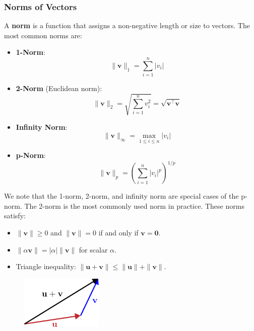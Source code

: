 \subsubsection{Norms of Vectors}
A \textbf{norm} is a function that assigns a non-negative length or size to vectors. The most common norms are:
\begin{itemize}
    \item \textbf{1-Norm}:
    \begin{equation*}
        \|\mathbf{v}\|_1 = \sum_{i=1}^n |v_i|
    \end{equation*}
    \item \textbf{2-Norm} (Euclidean norm):
    \begin{equation*}
        \|\mathbf{v}\|_2 = \sqrt{\sum_{i=1}^n v_i^2} = \sqrt{\mathbf{v}^\top \mathbf{v}}
    \end{equation*}
    \item \textbf{Infinity Norm}:
    \begin{equation*}
        \|\mathbf{v}\|_\infty = \max_{1 \leq i \leq n} |v_i|
    \end{equation*}
    \item \textbf{p-Norm}:
    \begin{equation*}
        \|\mathbf{v}\|_p = \left( \sum_{i=1}^n |v_i|^p \right)^{1/p}
    \end{equation*}
\end{itemize}
We note that the 1-norm, 2-norm, and infinity norm are special cases of the p-norm. The 2-norm is the most commonly used norm in practice. These norms satisfy:

\noindent
\begin{minipage}[t]{0.48\textwidth}
    \vspace{-0.4cm}
    \begin{itemize}
        \item $ \|\mathbf{v}\| \geq 0 $ and $ \|\mathbf{v}\| = 0 $ if and only if $ \mathbf{v} = \mathbf{0} $.
        \item $ \|\alpha \mathbf{v}\| = |\alpha| \|\mathbf{v}\| $ for scalar $ \alpha $.
        \item Triangle inequality: $ \|\mathbf{u} + \mathbf{v}\| \leq \|\mathbf{u}\| + \|\mathbf{v}\| $.
    \end{itemize}
\end{minipage}
\hfill
\begin{minipage}[t]{0.48\textwidth}
    \vspace{-1cm}
    \begin{figure}[H]
        \centering
        \includegraphics[width=0.35\textwidth]{figs/linear-algebra/triangle-inequality.pdf}
    \end{figure}
\end{minipage}


